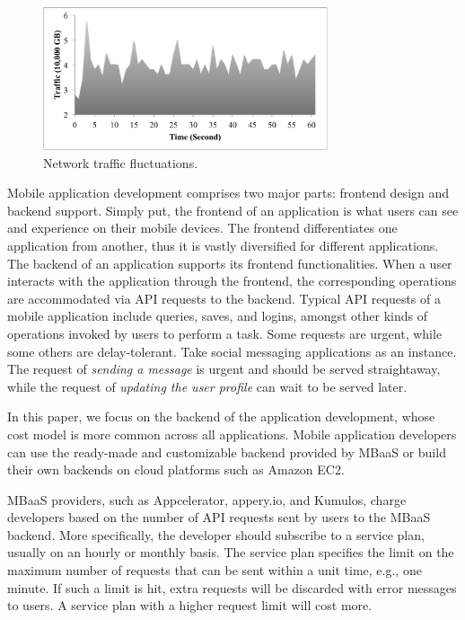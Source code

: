 \begin{figure}[t]
	\center
	\hspace{-0cm}
	\includegraphics[trim=5mm 5mm 5mm 3mm, clip,width=3.3in]{figs/traffic}
	\caption{Network traffic fluctuations.} \label{fig:traffic}
	\vspace{-0.cm}
\end{figure} 

Mobile application development comprises two major parts: frontend design and backend support. Simply put, the frontend of an application is what users can see and experience on their mobile devices. The frontend differentiates one application from another, thus it is vastly diversified for different applications. The backend of an application supports its frontend functionalities. When a user interacts with the application through the frontend, the corresponding operations are accommodated via API requests to the backend. Typical API requests of a mobile application include queries, saves, and logins, amongst other kinds of operations invoked by users to perform a task. Some requests are urgent, while some others are delay-tolerant. Take social messaging applications as an instance. The request of \emph{sending a message} is urgent and should be served straightaway, while the request of \emph{updating the user profile} can wait to be served later. 

In this paper, we focus on the backend of the application development, whose cost model is more common across all applications. Mobile application developers can use the ready-made and customizable backend provided by MBaaS or build their own backends on cloud platforms such as Amazon EC2. 

MBaaS providers, such as Appcelerator, appery.io, and Kumulos, charge developers based on the number of API requests sent by users to the MBaaS backend. More specifically, the developer should subscribe to a service plan, usually on an hourly or monthly basis. The service plan specifies the limit on the maximum number of requests that can be sent within a unit time, e.g., one minute. If such a limit is hit, extra requests will be discarded with error messages to users. A service plan with a higher request limit will cost more. 

